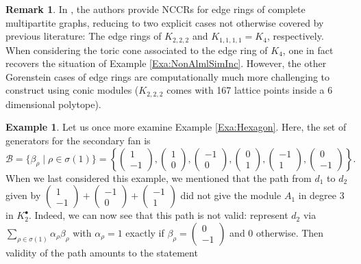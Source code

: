 \documentclass[reqno, 12pt]{amsart}
\theoremstyle{definition}
\newtheorem{remark}[theorem]{Remark}
\newtheorem{example}[theorem]{Example}
\numberwithin{equation}{section}
\begin{document}
\begin{remark}
In \cite{HM22}, the authors provide NCCRs for edge rings of complete multipartite graphs, reducing to two explicit cases not otherwise covered by previous literature: The edge rings of $K_{2,2,2}$ and $K_{1,1,1,1}=K_4$, respectively. When considering the toric cone associated to the edge ring of $K_4$, one in fact recovers the situation of Example \ref{Exa:NonAlmlSimInc}. However, the other Gorenstein cases of edge rings are computationally much more challenging to construct using conic modules ($K_{2,2,2}$ comes with 167 lattice points inside a 6 dimensional polytope).
\end{remark}



\begin{example}
    Let us once more examine Example \ref{Exa:Hexagon}. Here, the set of generators for the secondary fan is \[
    \mathcal{B}=\{\beta_\rho\mid \rho\in \sigma(1)\}=\left\{\begin{pmatrix}1\\ -1\end{pmatrix}, \begin{pmatrix}1\\ 0\end{pmatrix}, \begin{pmatrix}-1\\ 0\end{pmatrix}, \begin{pmatrix}0\\ 1\end{pmatrix}, \begin{pmatrix}-1\\ 1\end{pmatrix}, \begin{pmatrix}0\\ -1\end{pmatrix}\right\}.
    \]
    When we last considered this example, we mentioned that the path from $d_1$ to $d_2$ given by $\begin{pmatrix}1\\ -1\end{pmatrix}+\begin{pmatrix} -1\\0\end{pmatrix}+\begin{pmatrix}-1\\1\end{pmatrix}$ did not give the module $A_1$ in degree 3 in $K_2^\bullet$. Indeed, we can now see that this path is not valid: represent $d_2$ via $\sum_{\rho\in \sigma(1)}\alpha_\rho\beta_\rho$ with $\alpha_\rho=1$ exactly if $\beta_\rho=\begin{pmatrix} 0\\ -1\end{pmatrix}$ and 0 otherwise. Then validity of the path amounts to the statement\[
\]
\end{example}
\end{document}

